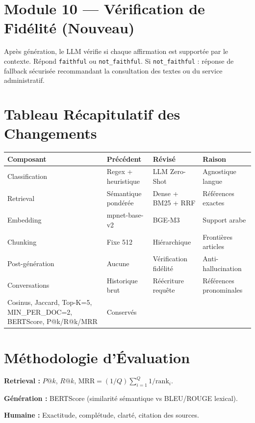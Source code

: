 \documentclass[11pt,a4paper]{article}
\begin{document}
\section{Module 10 --- Vérification de Fidélité (Nouveau)}

Après génération, le LLM vérifie si chaque affirmation est supportée par le contexte. Répond \texttt{faithful} ou \texttt{not\_faithful}. Si \texttt{not\_faithful} : réponse de fallback sécurisée recommandant la consultation des textes ou du service administratif.

\section{Tableau Récapitulatif des Changements}

\begin{center}
\small
\begin{tabular}{p{2.2cm}p{2.2cm}p{2.2cm}p{2.8cm}}
\toprule
\textbf{Composant} & \textbf{Précédent} & \textbf{Révisé} & \textbf{Raison} \\
\midrule
Classification & Regex + heuristique & LLM Zero-Shot & Agnostique langue \\
Retrieval & Sémantique pondérée & Dense + BM25 + RRF & Références exactes \\
Embedding & mpnet-base-v2 & BGE-M3 & Support arabe \\
Chunking & Fixe 512 & Hiérarchique & Frontières articles \\
Post-génération & Aucune & Vérification fidélité & Anti-hallucination \\
Conversations & Historique brut & Réécriture requête & Références pronominales \\
\midrule
Cosinus, Jaccard, Top-K=5, MIN\_PER\_DOC=2, BERTScore, P@k/R@k/MRR & Conservés \\
\bottomrule
\end{tabular}
\end{center}

\section{Méthodologie d'Évaluation}

\textbf{Retrieval :} $P@k$, $R@k$, $\text{MRR} = (1/Q) \sum_{i=1}^{Q} 1/\text{rank}_i$.

\textbf{Génération :} BERTScore (similarité sémantique vs BLEU/ROUGE lexical).

\textbf{Humaine :} Exactitude, complétude, clarté, citation des sources.
\end{document}
